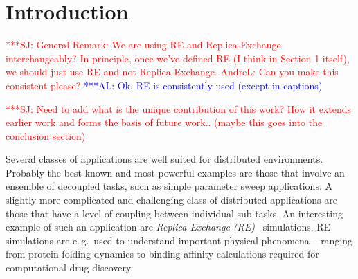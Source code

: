 \documentclass{rspublic}
\newcommand{\alnote}[1]{ {\textcolor{blue} { ***AL: #1 }}}
\newcommand{\jhanote}[1]{ {\textcolor{red} { ***SJ: #1 }}}
\newcommand{\alnote}[1]{}
\newcommand{\jhanote}[1]{}
\begin{document}
\begin{abstract}{Replica-Exchange, SAGA, Migol, Fault Tolerance}

  \jhanote{In this paper, we describe the design, development and
    deployment of a unique framework for constructing fault-tolerant
    distributed simulations.}

  \jhanote{Less emphasis on the SAGA/Migol framework: The framework
    consists of two primary components -- SAGA and Migol, is scalable,
    general purpose and extensible.}

  \jhanote{I think this can go: We provide details of a newly
    developed functionality in SAGA -- the Checkpoint and Recovery
    API. Migol is an adaptive Grid middleware, which addresses the
    fault tolerance of Grid applications and services by providing the
    capability to recover applications from checkpoint files
    transparently.  In addition to describing the integration of
    SAGA-CPR with the Migol infrastructure,} \alnote{I added a small
    note about Migol to the abstract (I tried to keep it short.)}

  \jhanote{We also outline our experiences with running a large scale,
    general-purpose, SAGA-CPR based RE application in a
    production distributed environment.}

\end{abstract}

\section{Introduction}

\jhanote{General Remark: We are using RE and Replica-Exchange interchangeably?
  In principle, once we've defined RE (I think in Section 1 itself), we 
  should just use RE and not Replica-Exchange. AndreL: Can you make this
  consistent please?}
\alnote{Ok. RE is consistently used (except in captions)}

\jhanote{Need to add what is the unique contribution of this work? How
  it extends earlier work and forms the basis of future work.. (maybe
  this goes into the conclusion section)}

Several classes of applications are well suited for distributed
environments. Probably the best known and most powerful examples are
those that involve an ensemble of decoupled tasks, such as simple
parameter sweep applications.  A slightly more complicated and
challenging class of distributed applications are those that have a
level of coupling between individual sub-tasks.  An interesting
example of such an application are \emph{Replica-Exchange
  (RE)}~\citep{hansmann,Sugita:1999rm} simulations.  RE simulations
are e.\,g.\ used to understand important physical phenomena -- ranging
from protein folding dynamics to binding affinity calculations
required for computational drug discovery.
  
\end{document}
